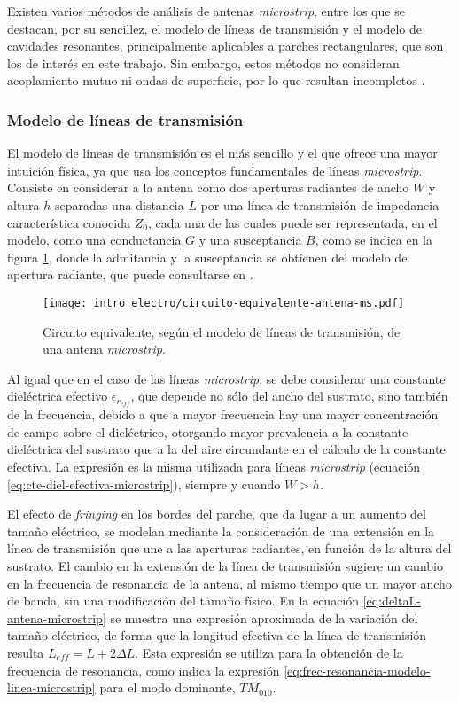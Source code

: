 Existen varios métodos de análisis de antenas \textit{microstrip}, entre los que se destacan, por su sencillez, el modelo de líneas de transmisión y el modelo de cavidades resonantes, principalmente aplicables a parches rectangulares, que son los de interés en este trabajo. Sin embargo, estos métodos no consideran acoplamiento mutuo ni ondas de superficie, por lo que resultan incompletos \cite{Pozar:InputImpedanceMutualCoupling}.
\subsubsection{Modelo de líneas de transmisión}
\label{subsubsec_microstrip_modeloLineas}
El modelo de líneas de transmisión es el más sencillo y el que ofrece una mayor intuición física, ya que usa los conceptos fundamentales de líneas \textit{microstrip}. Consiste en considerar a la antena como dos aperturas radiantes de ancho $W$ y altura $h$ separadas una distancia $L$ por una línea de transmisión de impedancia característica conocida $Z_0$, cada una de las cuales puede ser representada, en el modelo, como una conductancia $G$ y una susceptancia $B$, como se indica en la figura \ref{fig:circuito-equivalente-antena-ms}, donde la admitancia y la susceptancia se obtienen del modelo de apertura radiante, que puede consultarse en \cite{Balanis:Theory}.

\begin{figure}[htp]
	\centering
	\texttt{[image: intro\_electro/circuito-equivalente-antena-ms.pdf]}
	\caption{Circuito equivalente, según el modelo de líneas de transmisión, de una antena \textit{microstrip}.}
	\label{fig:circuito-equivalente-antena-ms}
\end{figure}




Al igual que en el caso de las líneas \textit{microstrip}, se debe considerar una constante dieléctrica efectivo $\epsilon_{r_{eff}}$, que depende no sólo del ancho del sustrato, sino también de la frecuencia, debido a que a mayor frecuencia hay una mayor concentración de campo sobre el dieléctrico, otorgando mayor prevalencia a la constante dieléctrica del sustrato que a la del aire circundante en el cálculo de la constante efectiva. La expresión es la misma utilizada para líneas \textit{microstrip} (ecuación \ref{eq:cte-diel-efectiva-microstrip}), siempre y cuando $W>h$.

El efecto de \textit{fringing} en los bordes del parche, que da lugar a un aumento del tamaño eléctrico, se modelan mediante la consideración de una extensión en la línea de transmisión que une a las aperturas radiantes, en función de la altura del sustrato. El cambio en la extensión de la línea de transmisión sugiere un cambio en la frecuencia de resonancia de la antena, al mismo tiempo que un mayor ancho de banda, sin una modificación del tamaño físico. En la ecuación \ref{eq:deltaL-antena-microstrip} se muestra una expresión aproximada de la variación del tamaño eléctrico, de forma que la longitud efectiva de la línea de transmisión resulta $L_{eff} = L + 2 \Delta L$. Esta expresión se utiliza para la obtención de la frecuencia de resonancia, como indica la expresión \ref{eq:frec-resonancia-modelo-linea-microstrip} para el modo dominante, $TM_{010}$.


